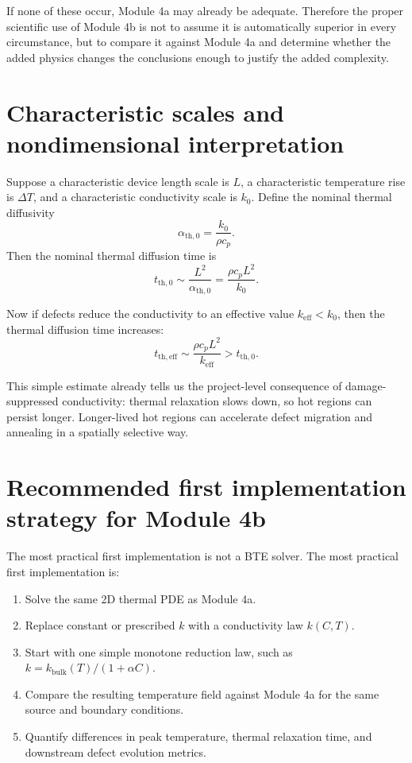 \documentclass[11pt]{article}
\begin{document}
If none of these occur, Module 4a may already be adequate. Therefore the proper scientific use of Module 4b is not to assume it is automatically superior in every circumstance, but to compare it against Module 4a and determine whether the added physics changes the conclusions enough to justify the added complexity.

\section{Characteristic scales and nondimensional interpretation}

Suppose a characteristic device length scale is $L$, a characteristic temperature rise is $\Delta T$, and a characteristic conductivity scale is $k_0$. Define the nominal thermal diffusivity
\[
 \alpha_{\mathrm{th},0} = \frac{k_0}{\rho c_p}.
\]
Then the nominal thermal diffusion time is
\[
 t_{\mathrm{th},0} \sim \frac{L^2}{\alpha_{\mathrm{th},0}} = \frac{\rho c_p L^2}{k_0}.
\]

Now if defects reduce the conductivity to an effective value $k_{\mathrm{eff}}<k_0$, then the thermal diffusion time increases:
\[
 t_{\mathrm{th,eff}} \sim \frac{\rho c_p L^2}{k_{\mathrm{eff}}} > t_{\mathrm{th},0}.
\]

This simple estimate already tells us the project-level consequence of damage-suppressed conductivity: thermal relaxation slows down, so hot regions can persist longer. Longer-lived hot regions can accelerate defect migration and annealing in a spatially selective way.

\section{Recommended first implementation strategy for Module 4b}

The most practical first implementation is not a BTE solver. The most practical first implementation is:
\begin{enumerate}[label=\arabic*.]
    \item Solve the same 2D thermal PDE as Module 4a.
    \item Replace constant or prescribed $k$ with a conductivity law $k(C,T)$.
    \item Start with one simple monotone reduction law, such as $k=k_{\mathrm{bulk}}(T)/(1+\alpha C)$.
    \item Compare the resulting temperature field against Module 4a for the same source and boundary conditions.
    \item Quantify differences in peak temperature, thermal relaxation time, and downstream defect evolution metrics.
\end{enumerate}
\end{document}
